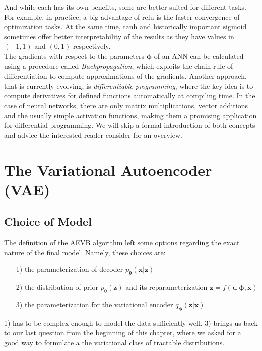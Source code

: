 \documentclass[12pt]{report}
\theoremstyle{definition}
\begin{document}
And while each has its own benefits, some are better suited for different tasks. For example, in practice, a big advantage of $\mathrm{relu}$ is the faster convergence of optimization tasks. At the same time, $\mathrm{tanh}$ and historically important $\mathrm{sigmoid}$ sometimes offer better interpretability of the results as they have values in $(-1, 1)$ and $(0, 1)$ respectively. \\
The gradients with respect to the parameters $\pmb{\phi}$ of an ANN can be calculated using a procedure called \emph{Backpropagation}, which exploits the chain rule of differentiation to compute approximations of the gradients. Another approach, that is currently evolving, is \emph{differentiable programming}, where the key idea is to compute derivatives for defined functions automatically at compiling time. In the case of neural networks, there are only matrix multiplications, vector additions and the usually simple activation functions, making them a promising application for differential programming. We will skip a formal introduction of both concepts and advice the interested reader consider \cite{diff} for an overview.


\section{The Variational Autoencoder (VAE)}
\subsection{Choice of Model}

The definition of the AEVB algorithm left some options regarding the exact nature of the final model. Namely, these choices are:
\begin{itemize}
\item[1)] the parameterization of decoder $p_{\pmb{\theta}}(\mathbf{x}|\mathbf{z})$
\item[2)] the distribution of prior $p_{\pmb{\theta}}(\mathbf{z})$ and its reparameterization $\mathbf{z} = f(\pmb{\epsilon}, \pmb{\phi}, \mathbf{x})$
\item[3)] the parameterization for the variational encoder $q_{\pmb{\phi}}(\mathbf{z}|\mathbf{x})$
\end{itemize}
1) has to be complex enough to model the data sufficiently well. 3) brings us back to our last question from the beginning of this chapter, where we asked for a good way to formulate a the variational class of tractable distributions.
\end{document}
